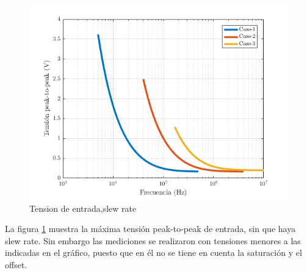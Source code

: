 \documentclass[../../main.tex]{subfiles}
\begin{document}
\begin{figure}[H]
\centering
\includegraphics[width=1\textwidth]{slew-rate-n}
\caption{Tension de entrada,slew rate} \label{fig=srn}
\end{figure}

La figura \ref{fig=srn} muestra la máxima tensión peak-to-peak de entrada, sin que haya slew rate. Sin embargo las mediciones se realizaron con tensiones menores a las indicadas en el gráfico, puesto que en él no se tiene en cuenta la saturación  y el offset.
\end{document}
